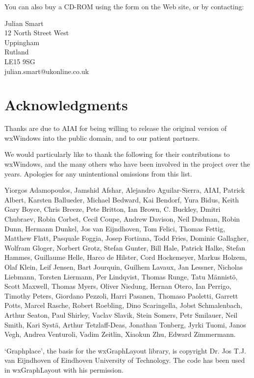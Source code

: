 You can also buy a CD-ROM using the form on the Web site, or by contacting:

Julian Smart\\
12 North Street West\\
Uppingham\\
Rutland\\
LE15 9SG\\
julian.smart@ukonline.co.uk

\section{Acknowledgments}

Thanks are due to AIAI for being willing to release the original version of
wxWindows into the public domain, and to our patient partners.

We would particularly like to thank the following for their contributions to wxWindows, and the many others who have been involved in
the project over the years. Apologies for any unintentional omissions from this list. 
 
Yiorgos Adamopoulos, Jamshid Afshar, Alejandro Aguilar-Sierra, AIAI, Patrick Albert, Karsten Ballueder, Michael Bedward, Kai Bendorf, Yura Bidus, Keith 
Gary Boyce, Chris Breeze, Pete Britton, Ian Brown, C. Buckley, Dmitri Chubraev, Robin Corbet, Cecil Coupe, Andrew Davison, Neil Dudman, Robin 
Dunn, Hermann Dunkel, Jos van Eijndhoven, Tom Felici, Thomas Fettig, Matthew Flatt, Pasquale Foggia, Josep Fortiana, Todd Fries, Dominic Gallagher, 
Wolfram Gloger, Norbert Grotz, Stefan Gunter, Bill Hale, Patrick Halke, Stefan Hammes, Guillaume Helle, Harco de Hilster, Cord Hockemeyer, Markus 
Holzem, Olaf Klein, Leif Jensen, Bart Jourquin, Guilhem Lavaux, Jan Lessner, Nicholas Liebmann, Torsten Liermann, Per Lindqvist, Thomas Runge, Tatu
M\"{a}nnist\"{o}, Scott Maxwell, Thomas Myers, Oliver Niedung, Hernan Otero, Ian Perrigo, Timothy Peters, Giordano Pezzoli, Harri Pasanen, Thomaso Paoletti, 
Garrett Potts, Marcel Rasche, Robert Roebling, Dino Scaringella, Jobst Schmalenbach, Arthur Seaton, Paul Shirley, Vaclav Slavik, Stein Somers, Petr Smilauer, Neil Smith, 
Kari Syst\"{a}, Arthur Tetzlaff-Deas, Jonathan Tonberg, Jyrki Tuomi, Janos Vegh, Andrea Venturoli, Vadim Zeitlin, Xiaokun Zhu, Edward Zimmermann.

`Graphplace', the basis for the wxGraphLayout library, is copyright Dr. Jos
T.J. van Eijndhoven of Eindhoven University of Technology. The code has
been used in wxGraphLayout with his permission.


